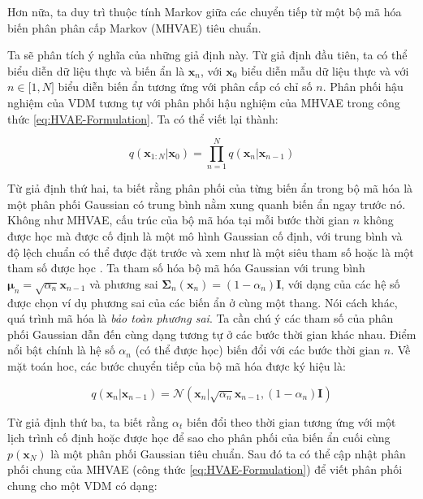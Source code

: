 \documentclass[14pt, a4paper]{article}
\numberwithin{equation}{section}
\numberwithin{figure}{section}
\numberwithin{dl}{section}
\numberwithin{md}{section}
\numberwithin{bd}{section}
\numberwithin{dn}{section}
\numberwithin{hq}{section}
\begin{document}
    Hơn nữa, ta duy trì thuộc tính Markov giữa các chuyển tiếp từ một bộ mã hóa biến phân phân cấp Markov (MHVAE) tiêu chuẩn.

    Ta sẽ phân tích ý nghĩa của những giả định này.
    Từ giả định đầu tiên, ta có thể biểu diễn dữ liệu thực và biến ẩn là $\boldsymbol{x}_n$, với $\boldsymbol{x}_0$ biểu diễn mẫu dữ liệu thực và với $n \in \lbrack 1, N \rbrack$ biểu diễn biến ẩn tương ứng với phân cấp có chỉ số $n$.
    Phân phối hậu nghiệm của VDM tương tự với phân phối hậu nghiệm của MHVAE trong công thức \ref{eq:HVAE-Formulation}.
    Ta có thể viết lại thành:

    \begin{equation}
        q(\boldsymbol{x}_{1:N}\vert \boldsymbol{x}_0) = \prod_{n=1}^N q(\boldsymbol{x}_{n} \vert \boldsymbol{x}_{n-1})
    \end{equation}

    Từ giả định thứ hai, ta biết rằng phân phối của từng biến ẩn trong bộ mã hóa là một phân phối Gaussian có trung bình nằm xung quanh biến ẩn ngay trước nó.
    Không như MHVAE, cấu trúc của bộ mã hóa tại mỗi bước thời gian $n$ không được học mà được cố định là một mô hình Gaussian cố định, với trung bình và độ lệch chuẩn có thể được đặt trước và xem như là một siêu tham số \cite{ho2020denoising} hoặc là một tham số được học \cite{kingma2021variational}.
    Ta tham số hóa bộ mã hóa Gaussian với trung bình $\boldsymbol{\mu}_n = \sqrt{\alpha_n} \boldsymbol{x}_{n-1}$ và phương sai $\boldsymbol{\Sigma}_n (\boldsymbol{x}_n) = (1 - \alpha_n) \boldsymbol{I}$, với dạng của các hệ số được chọn ví dụ phương sai của các biến ẩn ở cùng một thang.
    Nói cách khác, quá trình mã hóa là \textit{bảo toàn phương sai}.
    Ta cần chú ý các tham số của phân phối Gaussian dẫn đến cùng dạng tương tự ở các bước thời gian khác nhau.
    Điểm nổi bật chính là hệ số $\alpha_n$ (có thể được học) biến đổi với các bước thời gian $n$.
    Về mặt toán hoc, các bước chuyển tiếp của bộ mã hóa được ký hiệu là:

    \begin{equation} \label{eq:Forward-Process-Transition-Distribution}
        q(\boldsymbol{x}_n \vert \boldsymbol{x}_{n-1}) = \mathcal{N} (\boldsymbol{x}_n \vert \sqrt{\alpha_n} \boldsymbol{x}_{n-1}, (1 - \alpha_n) \boldsymbol{I})
    \end{equation}

    Từ giả định thứ ba, ta biết rằng $\alpha_t$ biến đổi theo thời gian tương ứng với một lịch trình cố định hoặc được học để sao cho phân phối của biến ẩn cuối cùng $p(\boldsymbol{x}_N)$ là một phân phối Gaussian tiêu chuẩn.
    Sau đó ta có thể cập nhật phân phối chung của MHVAE (công thức \ref{eq:HVAE-Formulation}) để viết phân phối chung cho một VDM có dạng:
    
\end{document}
